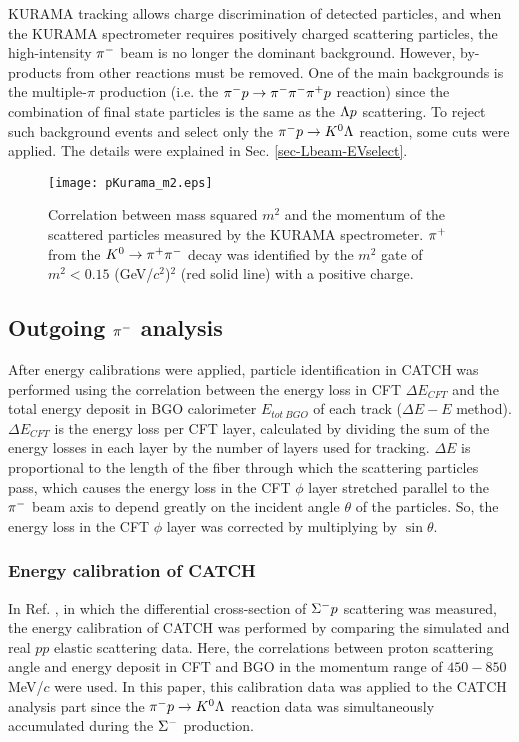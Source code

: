 KURAMA tracking allows charge discrimination of detected particles, and when the KURAMA spectrometer requires positively charged scattering particles, the high-intensity $\pi^{-}$ beam is no longer the dominant background. However, by-products from other reactions must be removed. One of the main backgrounds is the multiple-$\pi$ production (i.e. the $\pi^- p \to \pi^-\pi^-\pi^+p$ reaction) since the combination of final state particles is the same as the $\Lambda p$ scattering. To reject such background events and select only the $\pi^- p \to K^0 \Lambda$ reaction, some cuts were applied. The details were explained in Sec. \ref{sec-Lbeam-EVselect}. 

\begin{figure}[!h]
  \begin{center}
    \texttt{[image: pKurama\_m2.eps]}
    \caption{Correlation between mass squared $m^{2}$ and the momentum of the scattered particles measured by the KURAMA spectrometer. $\pi^{+}$ from the $K^0 \to \pi^+ \pi^-$ decay was identified by the $m^{2}$ gate of $m^{2}<0.15$ (GeV/$c^{2}$)$^{2}$ (red solid line) with a positive charge.}
    \label{fig-pKurama_m2}
  \end{center}
\end{figure}



\subsection{Outgoing $\pi^{-}$ analysis}
After energy calibrations \cite{Miwa-SMp} were applied, particle identification in CATCH was performed using the correlation between the energy loss in CFT $\Delta E_{CFT}$ and the total energy deposit in BGO calorimeter $E_{tot\ BGO}$ of each track ($\Delta E-E$ method). $\Delta E_{CFT}$ is the energy loss per CFT layer, calculated by dividing the sum of the energy losses in each layer by the number of layers used for tracking. $\Delta E$ is proportional to the length of the fiber through which the scattering particles pass, which causes the energy loss in the CFT $\phi$ layer stretched parallel to the $\pi^{-}$ beam axis to depend greatly on the incident angle $\theta$ of the particles. So, the energy loss in the CFT $\phi$ layer was corrected by multiplying by $\sin\theta$. 

\subsubsection{Energy calibration of CATCH}
In Ref. \cite{Miwa-SMp}, in which the differential cross-section of $\Sigma^{-}p$ scattering was measured, the energy calibration of CATCH was performed by comparing the simulated and real $pp$ elastic scattering data. Here, the correlations between proton scattering angle and energy deposit in CFT and BGO in the momentum range of $450-850$ MeV/$c$ were used. In this paper, this calibration data was applied to the CATCH analysis part since the $\pi^- p \to K^0 \Lambda$ reaction data was simultaneously accumulated during the $\Sigma^{-}$ production.

